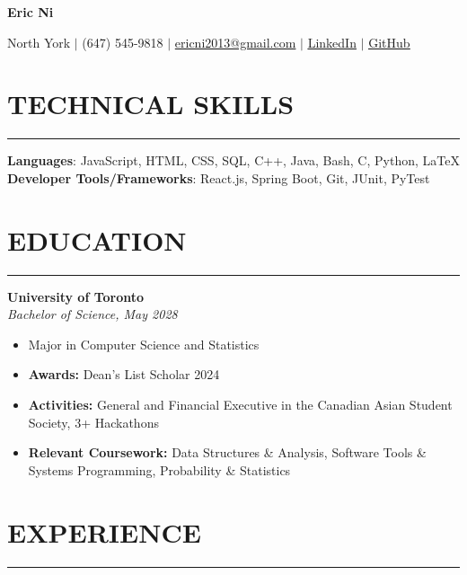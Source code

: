 \documentclass[letterpaper,10.5pt]{article}
\begin{document}
\begin{center}
\textbf{\huge{Eric Ni}}
\end{center}
\begin{center}
\small {North York $|$ (647) 545-9818 $|$ \underline{ericni2013@gmail.com} $|$ \underline{\href{https://www.linkedin.com/in/eric-ni-017985225/}{LinkedIn}} $|$ \underline{\href{https://github.com/ericnii}{GitHub}}}
\end{center}
\section*{\textnormal{TECHNICAL SKILLS}}\vspace{-19pt}
\noindent\rule{\textwidth}{0.4 pt}
\textbf{Languages}: JavaScript, HTML, CSS, SQL, C++, Java, Bash, C, Python, LaTeX\\
\textbf{Developer Tools/Frameworks}: React.js, Spring Boot, Git, JUnit, PyTest
\section*{\textnormal{EDUCATION}}\vspace{-19pt}
\noindent\rule{\textwidth}{0.4 pt}
\textbf{University of Toronto}
\hfill
\\
\emph{Bachelor of Science, May 2028}
\hfill
\emph{}
\begin{itemize}
\setlength\itemsep{1pt}
\item Major in Computer Science and Statistics
\item \textbf{Awards:} Dean's List Scholar 2024
\item \textbf{Activities:} General and Financial Executive in the Canadian Asian Student Society, 3+ Hackathons
\item \textbf{Relevant Coursework:} Data Structures \& Analysis, Software Tools \& Systems Programming, Probability \& Statistics
\end{itemize}
\section*{\textnormal{EXPERIENCE}}\vspace{-19pt}
\noindent\rule{\textwidth}{0.2 pt}
\end{document}
